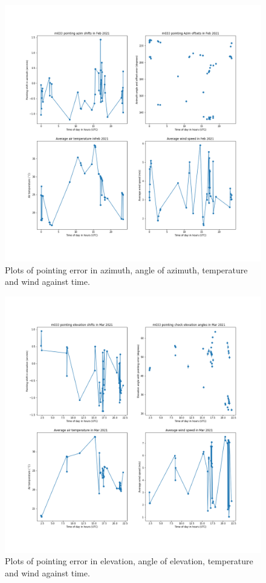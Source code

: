 \documentclass{article}
\begin{document}
\begin{figure}[H]
	\centering
	\includegraphics[scale=0.45]{m033_azim_Feb_mapped.png}
	
	\caption{Plots of pointing error in azimuth, angle of azimuth, temperature and wind against time.}
	\label{fig:m033AzimFebMapped}
\end{figure}


\begin{figure}[H]
	\centering
	\includegraphics[scale=0.45]{m033_elev_Mar_mapped.png}
	
	\caption{Plots of pointing error in elevation, angle of elevation, temperature and wind against time.}
	\label{fig:m033ElevMarMapped}
\end{figure}
\end{document}
